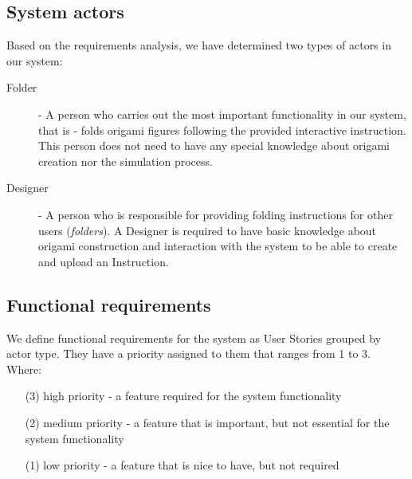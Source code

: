 \subsection{System actors}

Based on the requirements analysis, we have determined two types of actors in our system:

\begin{description}
	\item[Folder] \label{actors:folder} - A person who carries out the most important functionality in our system,
		that is - folds origami figures following the provided interactive instruction.
		This person does not need to have any special knowledge about origami creation nor the simulation process.
	\item[Designer] \label{actors:designer} - A person who is responsible for providing folding instructions
		for other users (\textit{folders}).
		A Designer is required to have basic knowledge about origami construction
		and interaction with the system to be able to create and upload an Instruction.
\end{description}

\newcommand{\requirement}[2]{\item #2. (#1)}
\subsection{Functional requirements}
\label{section:functional-requirements}

We define functional requirements for the system as User Stories grouped by actor type.
They have a priority assigned to them that ranges from 1 to 3. Where:

\begin{enumerate}
	\item[(3)] high priority - a feature required for the system functionality 
	\item[(2)] medium priority - a feature that is important, but not essential for the system functionality
	\item[(1)] low priority - a feature that is nice to have, but not required 
\end{enumerate}

